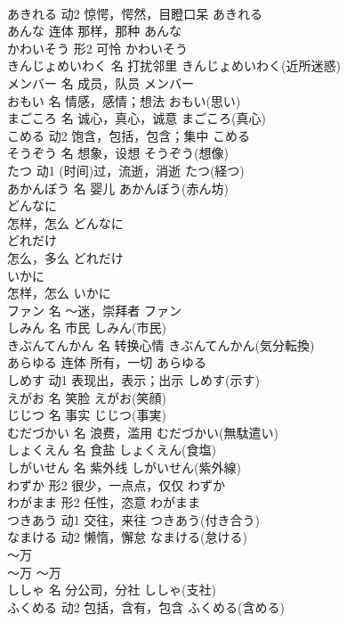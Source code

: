 \documentclass[8pt]{extreport}
\begin{document}
\begin{CJK}{UTF8}{min}
\\	あきれる	动2	惊愕，愕然，目瞪口呆	あきれる	
\\	あんな	连体	那样，那种	あんな	
\\	かわいそう	形2	可怜	かわいそう	
\\	きんじょめいわく	名	打扰邻里	きんじょめいわく(近所迷惑)	
\\	メンバー	名	成员，队员	メンバー	
\\	おもい	名	情感，感情；想法	おもい(思い)	
\\	まごころ	名	诚心，真心，诚意	まごころ(真心)	
\\	こめる	动2	饱含，包括，包含；集中	こめる	
\\	そうぞう	名	想象，设想	そうぞう(想像)	
\\	たつ	动1	(时间)过，流逝，消逝	たつ(経つ)	
\\	あかんぼう	名	婴儿	あかんぼう(赤ん坊)	
\\	どんなに	
\\	怎样，怎么	どんなに	
\\	どれだけ	
\\	怎么，多么	どれだけ	
\\	いかに	
\\	怎样，怎么	いかに	
\\	ファン	名	～迷，崇拜者	ファン	
\\	しみん	名	市民	しみん(市民)	
\\	きぶんてんかん	名	转换心情	きぶんてんかん(気分転換)	
\\	あらゆる	连体	所有，一切	あらゆる	
\\	しめす	动1	表现出，表示；出示	しめす(示す)	
\\	えがお	名	笑脸	えがお(笑顔)	
\\	じじつ	名	事实	じじつ(事実)	
\\	むだづかい	名	浪费，滥用	むだづかい(無駄遣い)	
\\	しょくえん	名	食盐	しょくえん(食塩)	
\\	しがいせん	名	紫外线	しがいせん(紫外線)	
\\	わずか	形2	很少，一点点，仅仅	わずか	
\\	わがまま	形2	任性，恣意	わがまま	
\\	つきあう	动1	交往，来往	つきあう(付き合う)	
\\	なまける	动2	懒惰，懈怠	なまける(怠ける)	
\\	～万	
\\	～万	～万	
\\	ししゃ	名	分公司，分社	ししゃ(支社)	
\\	ふくめる	动2	包括，含有，包含	ふくめる(含める)	

\end{CJK}
\end{document}

